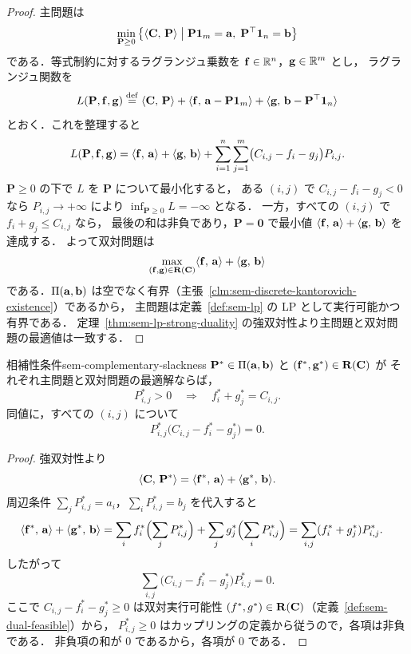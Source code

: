 \begin{proof}
  主問題は
  \[
    \min_{\mathbf{P} \geq 0}
    \left\{
      \langle \mathbf{C},\, \mathbf{P} \rangle
      \;\middle|\;
      \mathbf{P}\mathbf{1}_m = \mathbf{a},\;
      \mathbf{P}^\top \mathbf{1}_n = \mathbf{b}
    \right\}
  \]
  である．等式制約に対するラグランジュ乗数を
  $\mathbf{f} \in \mathbb{R}^n$，$\mathbf{g} \in \mathbb{R}^m$ とし，
  ラグランジュ関数を
  \[
    L(\mathbf{P}, \mathbf{f}, \mathbf{g})
    \overset{\mathrm{def}}{=}
    \langle \mathbf{C},\, \mathbf{P} \rangle
    + \langle \mathbf{f},\, \mathbf{a} - \mathbf{P}\mathbf{1}_m \rangle
    + \langle \mathbf{g},\, \mathbf{b} - \mathbf{P}^\top\mathbf{1}_n \rangle
  \]
  とおく．これを整理すると
  \[
    L(\mathbf{P}, \mathbf{f}, \mathbf{g})
    =
    \langle \mathbf{f},\, \mathbf{a} \rangle + \langle \mathbf{g},\, \mathbf{b} \rangle
    + \sum_{i=1}^n \sum_{j=1}^m
      \bigl(C_{i,j} - f_i - g_j\bigr) P_{i,j}.
  \]
  $\mathbf{P} \geq 0$ の下で $L$ を $\mathbf{P}$ について最小化すると，
  ある $(i,j)$ で $C_{i,j} - f_i - g_j < 0$ なら
  $P_{i,j} \to +\infty$ により $\inf_{\mathbf{P} \geq 0} L = -\infty$ となる．
  一方，すべての $(i,j)$ で $f_i + g_j \leq C_{i,j}$ なら，
  最後の和は非負であり，$\mathbf{P}=\mathbf{0}$ で最小値
  $\langle \mathbf{f},\, \mathbf{a} \rangle + \langle \mathbf{g},\, \mathbf{b} \rangle$ を達成する．
  よって双対問題は
  \[
    \max_{(\mathbf{f}, \mathbf{g}) \in \mathbf{R}(\mathbf{C})}
    \langle \mathbf{f},\, \mathbf{a} \rangle + \langle \mathbf{g},\, \mathbf{b} \rangle
  \]
  である．$\Pi(\mathbf{a}, \mathbf{b})$ は空でなく有界（主張~\ref{clm:sem-discrete-kantorovich-existence}）であるから，
  主問題は定義~\ref{def:sem-lp} の LP として実行可能かつ有界である．
  定理~\ref{thm:sem-lp-strong-duality} の強双対性より主問題と双対問題の最適値は一致する．
\end{proof}

\begin{proposition}{相補性条件}{sem-complementary-slackness}
  $\mathbf{P}^* \in \Pi(\mathbf{a}, \mathbf{b})$ と
  $(\mathbf{f}^*, \mathbf{g}^*) \in \mathbf{R}(\mathbf{C})$ が
  それぞれ主問題と双対問題の最適解ならば，
  \[
    P^*_{i,j} > 0
    \quad\Longrightarrow\quad
    f^*_i + g^*_j = C_{i,j}.
  \]
  同値に，すべての $(i,j)$ について
  \[
    P^*_{i,j}\bigl(C_{i,j} - f^*_i - g^*_j\bigr) = 0.
  \]
\end{proposition}

\begin{proof}
  強双対性より
  \[
    \langle \mathbf{C},\, \mathbf{P}^* \rangle
    =
    \langle \mathbf{f}^*,\, \mathbf{a} \rangle + \langle \mathbf{g}^*,\, \mathbf{b} \rangle.
  \]
  周辺条件 $\sum_j P^*_{i,j} = a_i$，$\sum_i P^*_{i,j} = b_j$ を代入すると
  \begin{align*}
    \langle \mathbf{f}^*,\, \mathbf{a} \rangle + \langle \mathbf{g}^*,\, \mathbf{b} \rangle
    &= \sum_i f_i^* \Bigl(\sum_j P^*_{i,j}\Bigr)
      + \sum_j g_j^* \Bigl(\sum_i P^*_{i,j}\Bigr)
    = \sum_{i,j} (f_i^* + g_j^*) P^*_{i,j}.
  \end{align*}
  したがって
  \[
    \sum_{i,j}
    \bigl(C_{i,j} - f_i^* - g_j^*\bigr) P^*_{i,j}
    = 0.
  \]
  ここで $C_{i,j} - f_i^* - g_j^* \geq 0$ は双対実行可能性
  $(f^*, g^*) \in \mathbf{R}(\mathbf{C})$（定義~\ref{def:sem-dual-feasible}）から，
  $P^*_{i,j} \geq 0$ はカップリングの定義から従うので，各項は非負である．
  非負項の和が $0$ であるから，各項が $0$ である．
\end{proof}

